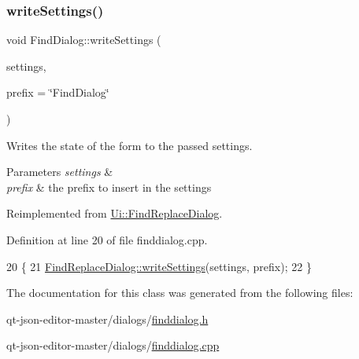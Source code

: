 \subsubsection{\texorpdfstring{write\+Settings()}{writeSettings()}}
{\footnotesize\ttfamily void Find\+Dialog\+::write\+Settings (\begin{DoxyParamCaption}\item[{Q\+Settings \&}]{settings,  }\item[{const Q\+String \&}]{prefix = {\ttfamily \char`\"{}FindDialog\char`\"{}} }\end{DoxyParamCaption})\hspace{0.3cm}{\ttfamily [virtual]}}

Writes the state of the form to the passed settings. 
\begin{DoxyParams}{Parameters}
{\em settings} & \\
\hline
{\em prefix} & the prefix to insert in the settings \\
\hline
\end{DoxyParams}


Reimplemented from \hyperlink{class_ui_1_1_find_replace_dialog_ad9216d8059c559596baa5ddcbda3ec0b}{Ui\+::\+Find\+Replace\+Dialog}.



Definition at line 20 of file finddialog.\+cpp.


\begin{DoxyCode}
20                                                                          \{
21     \hyperlink{class_ui_1_1_find_replace_dialog_ad9216d8059c559596baa5ddcbda3ec0b}{FindReplaceDialog::writeSettings}(settings, prefix);
22 \}
\end{DoxyCode}


The documentation for this class was generated from the following files\+:\begin{DoxyCompactItemize}
\item 
qt-\/json-\/editor-\/master/dialogs/\hyperlink{finddialog_8h}{finddialog.\+h}\item 
qt-\/json-\/editor-\/master/dialogs/\hyperlink{finddialog_8cpp}{finddialog.\+cpp}\end{DoxyCompactItemize}
